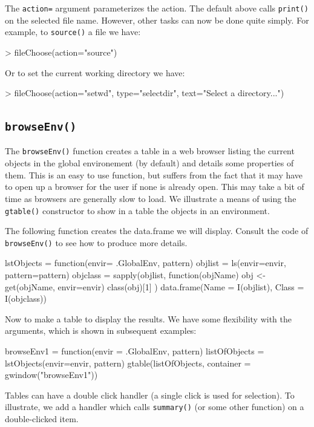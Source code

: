 \documentclass[12pt]{article}
\newcommand{\RFunc}[1]{\texttt{#1()}}
\newcommand{\RArg}[1]{\texttt{#1=}}
\begin{document}
The \RArg{action} argument parameterizes the action. The default above
calls \RFunc{print} on the selected file name. However, other tasks
can now be done quite simply. For example, to \RFunc{source} a file we
have:
\begin{Sinput}
> fileChoose(action="source")
\end{Sinput}

Or to set the  current working directory we have:
\begin{Sinput}
> fileChoose(action="setwd", type="selectdir", text="Select a directory...")
\end{Sinput}

\subsection{\RFunc{browseEnv}}
\label{sec:browseEnv}

The \RFunc{browseEnv} function creates a table in a web browser
listing the current objects in the global environement (by default)
and details some properties of them. This is an easy to use function,
but suffers from the fact that it may have to open up a browser for
the user if none is already open. This may take a bit of time as
browsers are generally slow to load. We illustrate a means of using
the \RFunc{gtable} constructor to show in a table the objects in an
environment.

The following function creates the data.frame we will display. Consult the code
of \RFunc{browseEnv} to see how to produce more details.

\begin{Scode}
  lstObjects = function(envir= .GlobalEnv, pattern) {
    objlist = ls(envir=envir, pattern=pattern)
    objclass = sapply(objlist, function(objName) {
      obj <- get(objName, envir=envir)
      class(obj)[1]
    })
    data.frame(Name = I(objlist), Class = I(objclass))
  }
\end{Scode}

Now to make a table to display the results. We have some flexibility
with the arguments, which is shown in subsequent examples:


\begin{Scode}
  browseEnv1 = function(envir = .GlobalEnv, pattern) {
    listOfObjects = lstObjects(envir=envir, pattern)
    gtable(listOfObjects, container = gwindow("browseEnv1"))
  }
\end{Scode}

Tables can have a double click handler (a single click is used for
selection). To illustrate, we  add a handler which 
calls \RFunc{summary} (or some other function) on a double-clicked item.
\end{document}
